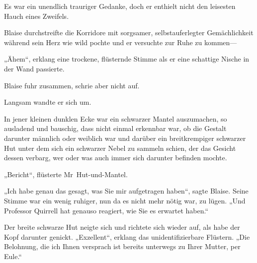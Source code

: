 Es war ein unendlich trauriger Gedanke, doch er enthielt nicht den leisesten Hauch eines Zweifels.


Blaise durchstreifte die Korridore mit sorgsamer, selbstauferlegter Gemächlichkeit während sein Herz wie wild pochte und er versuchte zur Ruhe zu kommen—

„Ähem“, erklang eine trockene, flüsternde Stimme als er eine schattige Nische in der Wand passierte.

Blaise fuhr zusammen, schrie aber nicht auf.

Langsam wandte er sich um.

In jener kleinen dunklen Ecke war ein schwarzer Mantel auszumachen, so ausladend und bauschig, dass nicht einmal erkennbar war, ob die Gestalt darunter männlich oder weiblich war und darüber ein breitkrempiger schwarzer Hut unter dem sich ein schwarzer Nebel zu sammeln schien, der das Gesicht dessen verbarg, wer oder was auch immer sich darunter befinden mochte.

„Bericht“, flüsterte Mr~Hut-und-Mantel.

„Ich habe genau das gesagt, was Sie mir aufgetragen haben“, sagte Blaise. Seine Stimme war ein wenig ruhiger, nun da es nicht mehr nötig war, zu lügen. „Und Professor Quirrell hat genauso reagiert, wie Sie es erwartet haben.“

Der breite schwarze Hut neigte sich und richtete sich wieder auf, als habe der Kopf darunter genickt. „Exzellent“, erklang das unidentifizierbare Flüstern. „Die Belohnung, die ich Ihnen versprach ist bereits unterwegs zu Ihrer Mutter, per Eule.“


